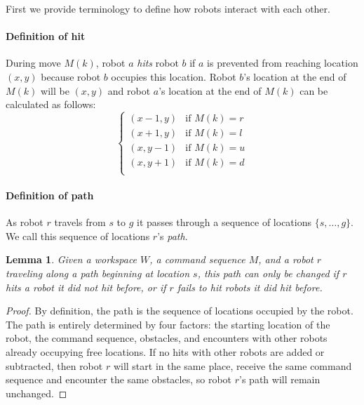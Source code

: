 \documentclass[letterpaper, 10 pt, conference]{ieeeconf}
\newtheorem{lemma}[theorem]{Lemma}
\begin{document}
First we provide terminology to define how robots interact with each other. 


\paragraph{Definition of hit}
During move $M(k)$, robot $a$ \emph{hits} robot $b$ if $a$ is prevented from reaching location $(x,y)$ because robot $b$ occupies this location. Robot $b$'s location at the end of $M(k)$ will be $(x,y)$ and robot $a$'s location at the end of $M(k)$ can be calculated as follows:
\begin{displaymath}
    \left\{
     \begin{array}{ll}
       (x-1,y) &\text{if }M(k)=r\\
       (x+1,y) &\text{if }M(k)=l\\
       (x,y-1) &\text{if }M(k)=u\\
       (x,y+1) &\text{if }M(k)=d\\
     \end{array}
   \right.
\end{displaymath} 

\paragraph{Definition of path}
As robot $r$ travels from $s$ to $g$ it passes through a sequence of locations $\{s,\ldots,g\}$.  We call this sequence of locations $r$'s \emph{path}. 

\begin{lemma}\label{lemma:changeInHitsNeededToChangePath}
Given a workspace $W$, a command sequence $M$, and a robot $r$ traveling along a path beginning at location $s$, this path can only be changed if $r$ hits a robot it did not hit before, or if $r$ fails to hit robots it did hit before.
\end{lemma}

\begin{proof}
By definition, the path is the sequence of locations occupied by the robot. The path is entirely determined by four factors: the starting location of the robot, the command sequence, obstacles,  and encounters with other robots already occupying free locations. If no hits with other robots are added or subtracted, then robot $r$ will start in the same place, receive the same command sequence and encounter the same obstacles, so robot $r$'s path will remain unchanged.  
\end{proof}
\end{document}
